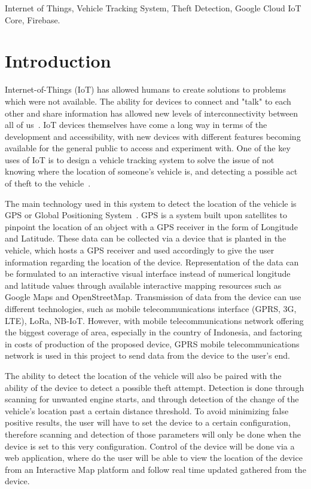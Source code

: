 \documentclass[conference]{IEEEtran}
\begin{document}
\begin{IEEEkeywords}
Internet of Things, Vehicle Tracking System, Theft Detection, Google Cloud IoT Core, Firebase.
\end{IEEEkeywords}

\section{Introduction}
Internet-of-Things (IoT) has allowed humans to create solutions to problems which were not available. The ability for devices to connect and "talk" to each other and share information has allowed new levels of interconnectivity between all of us~\cite{iotmounika}. IoT devices themselves have come a long way in terms of the development and accessibility, with new devices with different features becoming available for the general public to access and experiment with. One of the key uses of IoT is to design a vehicle tracking system to solve the issue of not knowing where the location of someone's vehicle is, and detecting a possible act of theft to the vehicle~\cite{lu2014wireless}. 

The main technology used in this system to detect the location of the vehicle is GPS or Global Positioning System~\cite{iotmounika,6132526,6803187,article1}. GPS is a system built upon satellites to pinpoint the location of an object with a GPS receiver in the form of Longitude and Latitude. These data can be collected via a device that is planted in the vehicle, which hosts a GPS receiver and used accordingly to give the user information regarding the location of the device. Representation of the data can be formulated to an interactive visual interface instead of numerical longitude and latitude values through available interactive mapping resources such as Google Maps and OpenStreetMap. Transmission of data from the device can use different technologies, such as mobile telecommunications interface (GPRS, 3G, LTE), LoRa, NB-IoT. However, with mobile telecommunications network offering the biggest coverage of area, especially in the country of Indonesia, and factoring in costs of production of the proposed device, GPRS mobile telecommunications network is used in this project to send data from the device to the user's end.

The ability to detect the location of the vehicle will also be paired with the ability of the device to detect a possible theft attempt. Detection is done through scanning for unwanted engine starts, and through detection of the change of the vehicle's location past a certain distance threshold. To avoid minimizing false positive results, the user will have to set the device to a certain configuration, therefore scanning and detection of those parameters will only be done when the device is set to this very configuration. Control of the device will be done via a web application, where do the user will be able to view the location of the device from an Interactive Map platform and follow real time updated gathered from the device.
\end{document}
